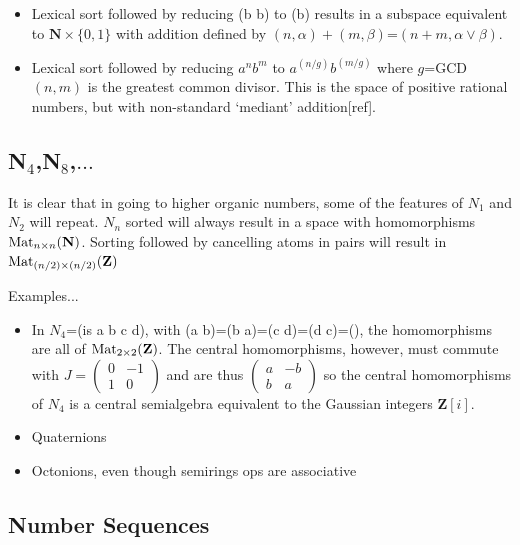\documentclass[11pt]{article}
\begin{document}
\begin{itemize}
\item{Lexical sort followed by reducing (b b) to (b) results in a subspace equivalent to $\mathbf N\times\{0,1\}$ with addition
defined by $(n,\alpha)+(m,\beta)$=$(n+m,\alpha\vee\beta)$.}

\item{Lexical sort followed by reducing $a^n b^m$ to $a^{(n/g)} b^{(m/g)}$ where $g$=GCD$(n,m)$ is the greatest common divisor.  
This is the space of positive rational numbers, but with non-standard `mediant' addition[ref].}

\end{itemize}

\subsection{N$_4$,N$_8$,$\dots$} 

     It is clear that in going to higher organic numbers, some of the features of $N_1$ and $N_2$ will repeat.  $N_n$ sorted 
 will always result in a space with homomorphisms ${\rm Mat}_{n\times n}(\mathbf N)$.  Sorting followed by cancelling 
 atoms in pairs will result in ${\rm Mat}_{(n/2)\times (n/2)}(\mathbf Z)$
 
 Examples...
 \begin{itemize}
 \item{In $N_4$=(is a b c d), with (a b)=(b a)=(c d)=(d c)=(), the homomorphisms are all of ${\rm Mat}_{2\times 2}(\mathbf Z)$.  The 
 central homomorphisms, however, must commute with 
 $
J=
\left (
\begin{array}{cc} 
0 & -1 \\ 1 & 0 
\end{array}
\right ) 
$
and are thus 
$
\left (
\begin{array}{cc} 
a & -b \\ b & a 
\end{array}
\right ) 
$
so the central homomorphisms of $N_4$ is a central semialgebra equivalent to the Gaussian integers ${\mathbf Z}[i]$.
}

\item{Quaternions}
\item{Octonions, even though semirings ops are associative}  
\end{itemize} 

\subsection{Number Sequences}
\end{document}

